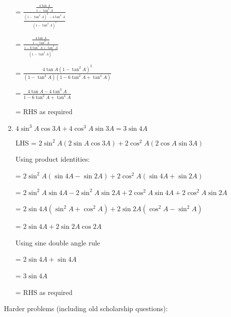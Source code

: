 \documentclass[../main.tex]{subfiles}
\begin{document}
\begin{enumerate}
    = $\frac{\frac{4\tan{A}}{1-\tan^2{A}}}{\frac{(1-\tan^2{A})^2-4\tan^2{A}}{(1-\tan^2{A})^2}}$

    = $\frac{\frac{4\tan{A}}{1-\tan^2{A}}}{\frac{1-6\tan^2{A}+\tan^4{A}}{(1-\tan^2{A})^2}}$

    = $\frac{4\tan{A}(1-\tan^2{A})^2}{(1-\tan^2{A})(1-6\tan^2{A}+\tan^4{A})}$

    = $\frac{4\tan{A}-4\tan^3{A}}{1-6\tan^2{A}+\tan^4{A}}$

    = RHS as required

    \item $4\sin^3{A}\cos{3A}+4\cos^3{A}\sin{3A}=3\sin{4A}$

    LHS = $2\sin^2{A}(2\sin{A}\cos{3A})+2\cos^2{A}(2\cos{A}\sin{3A})$

    Using product identities:

    = $2\sin^2{A}(\sin{4A}-\sin{2A})+2\cos^2{A}(\sin{4A}+\sin{2A})$

    = $2\sin^2{A}\sin{4A}-2\sin^2{A}\sin{2A}+2\cos^2{A}\sin{4A}+2\cos^2{A}\sin{2A}$

    = $2\sin{4A}(\sin^2{A}+\cos^2{A})+2\sin{2A}(\cos^2{A}-\sin^2{A})$

    = $2\sin{4A}+2\sin{2A}\cos{2A}$

    Using sine double angle rule

    = $2\sin{4A}+\sin{4A}$

    = $3\sin{4A}$

    = RHS as required


\end{enumerate}
Harder problems (including old scholarship questions):
\end{document}
